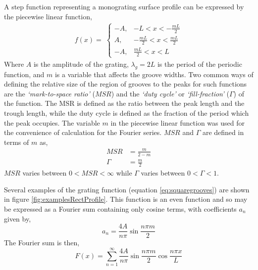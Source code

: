A step function representing a monograting surface profile can be expressed by the piecewise linear function,
\begin{align}
f(x) =\;\begin{cases}
-A,& -L < x < -\frac{mL}{2}\\
A, &-\frac{mL}{2} < x < \frac{mL}{2}\\
-A, &\frac{mL}{2} < x < L
\end{cases}\label{eq:squaregrooves}
\end{align}
Where $A$ is the amplitude of the grating, $\lambda_g=2L$ is the period of the periodic function, and $m$ is a variable that affects the groove widths. Two common ways of defining the relative size of the region of grooves to the peaks for such functions are the \textit{`mark-to-space ratio'} ($MSR$) and the \textit{`duty cycle'} or \textit{`fill-fraction'} ($\Gamma$) of the function. The MSR is defined as the ratio between the peak length and the trough length, while the duty cycle is defined as the fraction of the period which the peak occupies. The variable $m$ in the piecewise linear function was used for the convenience of calculation for the Fourier series. $MSR$ and $\Gamma$ are defined in terms of $m$ as,
\begin{align*}
MSR&=\frac{m}{2-m}\\
\Gamma&=\frac{m}{2}
\end{align*} 
$MSR$ varies between $0<MSR<\infty$ while $\Gamma$ varies between $0<\Gamma<1$.

Several examples of the grating function (equation \ref{eq:squaregrooves}) are shown in figure \ref{fig:examplesRectProfile}. This function is an even function and so may be expressed as a Fourier sum containing only cosine terms, with coefficients $a_n$ given by,
\begin{equation}
a_n=\frac{4A}{n \pi}\sin{\frac{n \pi m}{2}}
\label{eq:an-squareprofle}
\end{equation}
The Fourier sum is then,
\begin{equation*}
F(x) = \sum\limits_{n=1}^\infty  \frac{4A}{n \pi}\sin{\frac{n \pi m}{2}} \cos{\frac{n \pi x}{L}}
\end{equation*}

